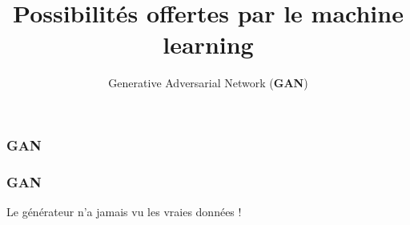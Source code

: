 \documentclass{formation}
\title{Possibilités offertes par le machine learning}
\subtitle{Generative Adversarial Network (\textbf{GAN})}
\begin{document}
\maketitle

\begin{frame}
  \frametitle{GAN}
  \href{https://reiinakano.github.io/gan-playground/}{}
\end{frame}

\begin{frame}
  \frametitle{GAN}
  Le générateur n'a jamais vu les vraies données !
\end{frame}
\end{document}
